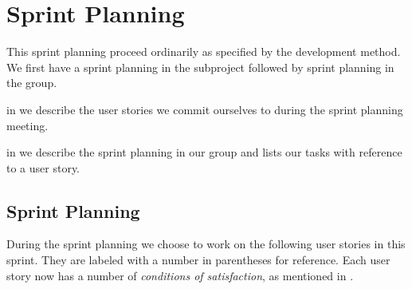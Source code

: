 \chapter{Sprint Planning}\label{chap:s4_sprintplanning}
This sprint planning proceed ordinarily as specified by the development method. We first have a sprint planning in the subproject followed by sprint planning in the group.

\begin{chapterorganization}
  \item in  we describe the user stories we commit ourselves to during the \bd sprint planning meeting.
  \item in  we describe the sprint planning in our group and lists our tasks with reference to a user story.
\end{chapterorganization}

\section{\bdtitle Sprint Planning}\label{sec:S4_bd}
During the \bd sprint planning we choose to work on the following user stories in this sprint. They are labeled with a number in parentheses for reference. Each user story now has a number of \emph{conditions of satisfaction}, as mentioned in .


